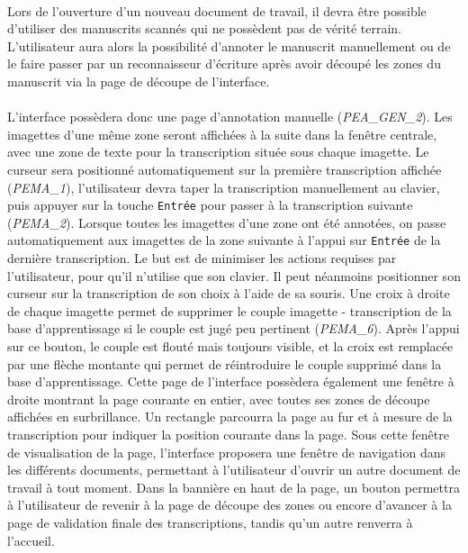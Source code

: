 \paragraph{}
Lors de l’ouverture d’un nouveau document de travail, il devra être possible d’utiliser des manuscrits scannés qui ne possèdent pas de vérité terrain. L’utilisateur aura alors la possibilité d’annoter le manuscrit manuellement ou de le faire passer par un reconnaisseur d’écriture après avoir découpé les zones du manuscrit via la page de découpe de l’interface.

\paragraph{}
L’interface possèdera donc une page d’annotation manuelle (\textit{PEA\_GEN\_2}). Les imagettes d’une même zone seront affichées à la suite dans la fenêtre centrale, avec une zone de texte pour la transcription située sous chaque imagette. Le curseur sera positionné automatiquement sur la première transcription affichée (\textit{PEMA\_1}), l’utilisateur devra taper la transcription manuellement au clavier, puis appuyer sur la touche \texttt{Entrée} pour passer à la transcription suivante (\textit{PEMA\_2}). Lorsque toutes les imagettes d’une zone ont été annotées, on passe automatiquement aux imagettes de la zone suivante à l’appui sur \texttt{Entrée} de la dernière transcription. Le but est de minimiser les actions requises par l’utilisateur, pour qu’il n’utilise que son clavier. Il peut néanmoins positionner son curseur sur la transcription de son choix à l’aide de sa souris.
\newline{}
Une croix à droite de chaque imagette permet de supprimer le couple imagette - transcription de la base d’apprentissage si le couple est jugé peu pertinent (\textit{PEMA\_6}). Après l’appui sur ce bouton, le couple est flouté mais toujours visible, et la croix est remplacée par une flèche montante qui permet de réintroduire le couple supprimé dans la base d’apprentissage.
\newline{}
Cette page de l’interface possèdera également une fenêtre à droite montrant la page courante en entier, avec toutes ses zones de découpe affichées en surbrillance. Un rectangle parcourra la page au fur et à mesure de la transcription pour indiquer la position courante dans la page.
\newline{}
Sous cette fenêtre de visualisation de la page, l’interface proposera une fenêtre de navigation dans les différents documents, permettant à l’utilisateur d’ouvrir un autre document de travail à tout moment.
\newline{}
Dans la bannière en haut de la page, un bouton permettra à l’utilisateur de revenir à la page de découpe des zones ou encore d’avancer à la page de validation finale des transcriptions, tandis qu’un autre renverra à l’accueil.

